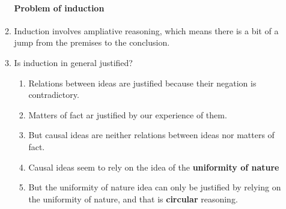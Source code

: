 \documentclass[10pt,landscape]{article}
\begin{document}
\begin{multicols}{2}
\begin{enumerate}
\begin{enumerate}
\paragraph{Problem of induction}
    \item Induction involves ampliative reasoning, which means there is a bit of a jump from the premises to the conclusion.
    \item Is induction in general justified?
      \begin{enumerate}
       \item Relations between ideas are justified because their negation is contradictory.
       \item Matters of fact ar justified by our experience of them.
       \item But causal ideas are neither relations between ideas nor matters of fact.
       \item Causal ideas seem to rely on the idea of the \textbf{uniformity of nature}
       \item But the uniformity of nature idea can only be justified by relying on the uniformity of nature, and that is \textbf{circular} reasoning.
      \end{enumerate}

      

\end{enumerate}
\end{enumerate}
\end{multicols}
\end{document}
